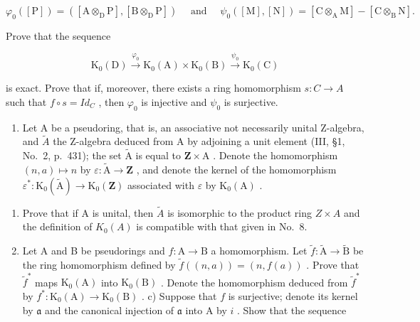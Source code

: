 \[
\varphi_ {0} ([ \mathrm{P} ]) = ([ \mathrm{A} \otimes_ {\mathrm{D}} \mathrm{P} ], [ \mathrm{B} \otimes_ {\mathrm{D}} \mathrm{P} ]) \quad \text { and } \quad \psi_ {0} ([ \mathrm{M} ], [ \mathrm{N} ]) = [ \mathrm{C} \otimes_ {\mathrm{A}} \mathrm{M} ] - [ \mathrm{C} \otimes_ {\mathrm{B}} \mathrm{N} ].
\]

Prove that the sequence

\[
\mathrm{K} _ {0} (\mathrm{D}) \xrightarrow {\varphi_ {0}} \mathrm{K} _ {0} (\mathrm{A}) \times \mathrm{K} _ {0} (\mathrm{B}) \xrightarrow {\psi_ {0}} \mathrm{K} _ {0} (\mathrm{C})
\]

is exact. Prove that if, moreover, there exists a ring homomorphism \(s: C \to A\) such that \(f \circ s = Id_{C}\) , then \(\varphi_{0}\) is injective and \(\psi_{0}\) is surjective.

\begin{enumerate}
\def\labelenumi{\arabic{enumi})}
\setcounter{enumi}{8}
\tightlist
\item
  Let A be a pseudoring, that is, an associative not necessarily unital Z-algebra, and \(\widetilde{A}\) the Z-algebra deduced from A by adjoining a unit element (III, §1, No.~2, p.~431); the set \(\widetilde{\mathrm{A}}\) is equal to \(\mathbf{Z} \times \mathrm{A}\) . Denote the homomorphism \((n, a) \mapsto n\) by \(\varepsilon : \widetilde{\mathrm{A}} \to \mathbf{Z}\) , and denote the kernel of the homomorphism \(\varepsilon^{*} : \mathrm{K}_{0}(\widetilde{\mathrm{A}}) \to \mathrm{K}_{0}(\mathbf{Z})\) associated with \(\varepsilon\) by \(\mathrm{K}_{0}(\mathrm{A})\) .
\end{enumerate}

\begin{enumerate}
\def\labelenumi{\alph{enumi})}
\item
  Prove that if A is unital, then \(\tilde{A}\) is isomorphic to the product ring \(Z \times A\) and the definition of \(K_{0}(A)\) is compatible with that given in No.~8.
\item
  Let A and B be pseudorings and \(f: \mathrm{A} \to \mathrm{B}\) a homomorphism. Let \(\widetilde{f}: \widetilde{\mathrm{A}} \to \widetilde{\mathrm{B}}\) be the ring homomorphism defined by \(\widetilde{f}((n, a)) = (n, f(a))\) . Prove that \(\widetilde{f}^*\) maps \(\mathrm{K}_0(\mathrm{A})\) into \(\mathrm{K}_0(\mathrm{B})\) . Denote the homomorphism deduced from \(\widetilde{f}^*\) by \(f^*: \mathrm{K}_0(\mathrm{A}) \to \mathrm{K}_0(\mathrm{B})\) . c) Suppose that \(f\) is surjective; denote its kernel by \(\mathfrak{a}\) and the canonical injection of \(\mathfrak{a}\) into A by \(i\) . Show that the sequence
\end{enumerate}

